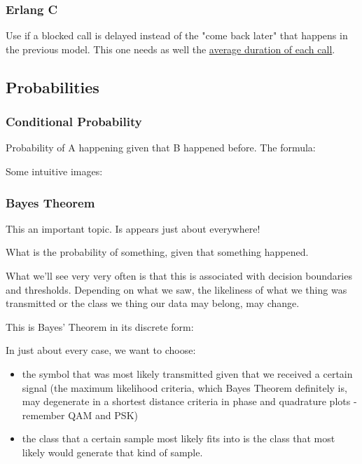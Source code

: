 \subsubsection*{Erlang C}
Use if a blocked call is delayed instead of the "come back later" that happens in the previous model. This one needs as well the \ul{average duration of each call}.




\subsection{Probabilities}


\subsubsection{Conditional Probability}

Probability of A happening given that B happened before. 
The formula:

Some intuitive images:





\subsubsection{Bayes Theorem}

This an important topic. Is appears just about everywhere!

What is the probability of something, given that something happened.

What we'll see very very often is that this is associated with decision 
boundaries and thresholds. Depending on what we saw, the likeliness of what we 
thing was transmitted or the class we thing our data may belong, may change.

This is Bayes' Theorem in its discrete form:




In just about every case, we want to choose:
\begin{itemize}
    \item the symbol that was most likely transmitted given that we received a certain signal (the maximum likelihood criteria, which Bayes Theorem definitely is, may degenerate in a shortest distance criteria in phase and quadrature plots - remember QAM and PSK)
    \item the class that a certain sample most likely fits into is the class that most likely would generate that kind of sample. 
\end{itemize} 

